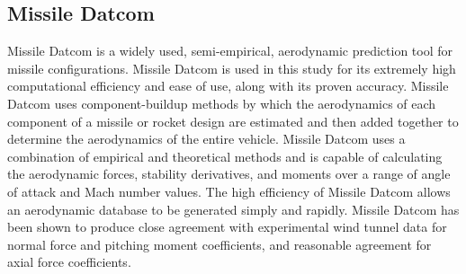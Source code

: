 \subsection{Missile Datcom}
Missile Datcom is a widely used, semi-empirical, aerodynamic prediction tool for missile configurations. Missile Datcom is used in this study for its extremely high computational efficiency and ease of use, along with its proven accuracy\cite{Sooy2005}. Missile Datcom uses component-buildup methods by which the aerodynamics of each component of a missile or rocket design are estimated and then added together to determine the aerodynamics of the entire vehicle. Missile Datcom uses a combination of empirical and theoretical methods and is capable of calculating the aerodynamic forces, stability derivatives, and moments over a range of angle of attack and Mach number values. The high efficiency of Missile Datcom allows an aerodynamic database to be generated simply and rapidly. Missile Datcom has been shown to produce close agreement with experimental wind tunnel data for normal force and pitching moment coefficients, and reasonable agreement for axial force coefficients\cite{Sooy2005}. 


      
